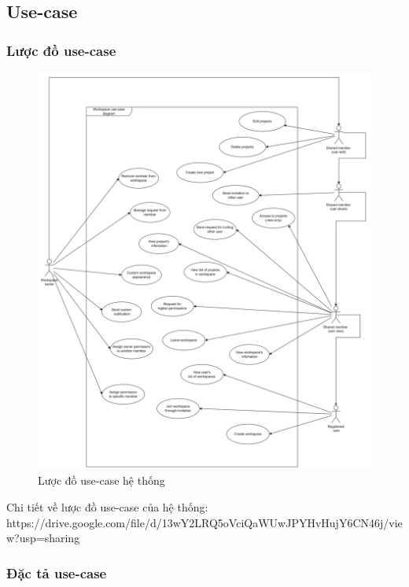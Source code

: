 \subsection{Use-case}
\subsubsection{Lược đồ use-case}

\begin{figure}[H]
    \begin{center}
        \includegraphics[width=1\textwidth]{Content/Phân tích và thiết kế hệ thống/documents/Use case/images/System usecase.png}
        \caption{Lược đồ use-case hệ thống}
        \label{fig: Lược đồ use-case hệ thống}
    \end{center}
\end{figure}

Chi tiết về lược đồ use-case của hệ thống: 
\newline
https://drive.google.com/file/d/13wY2LRQ5oVciQaWUwJPYHvHujY6CN46j/view?usp=sharing  

\subsubsection{Đặc tả use-case}

